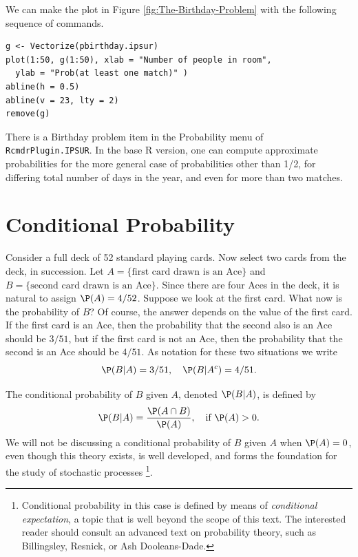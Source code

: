 \documentclass[captions=tableheading]{scrbook}
\begin{document}
We can make the plot in Figure \ref{fig:The-Birthday-Problem} with the following sequence of commands.


\begin{verbatim}
g <- Vectorize(pbirthday.ipsur)
plot(1:50, g(1:50), xlab = "Number of people in room", 
  ylab = "Prob(at least one match)" )
abline(h = 0.5)
abline(v = 23, lty = 2)
remove(g)
\end{verbatim}

There is a \textsf{Birthday problem} item in the \textsf{Probability} menu of \texttt{RcmdrPlugin.IPSUR}. In the base \textsf{R} version, one can compute approximate probabilities for the more general case of probabilities other than 1/2, for differing total number of days in the year, and even for more than two matches.
\section{Conditional Probability}
\label{sec-4-6}

\label{sec:Conditional-Probability}

Consider a full deck of 52 standard playing cards. Now select two cards from the deck, in succession. Let \( A = \{ \mbox{first card drawn is an Ace} \} \) and \( B = \{ \mbox{second card drawn is an Ace} \} \). Since there are four Aces in the deck, it is natural to assign \( \P(A) = 4/52 \). Suppose we look at the first card. What now is the probability of \(B\)? Of course, the answer depends on the value of the first card. If the first card is an Ace, then the probability that the second also is an Ace should be \( 3/51 \), but if the first card is not an Ace, then the probability that the second is an Ace should be \( 4/51 \). As notation for these two situations we write
\[
\P(B|A)=3/51,\quad\P(B|A^{c})=4/51.
\]

\begin{defn}
The conditional probability of \(B\) given \(A\), denoted \(\P(B|A)\), is defined by
\begin{equation}
\P(B|A)=\frac{\P(A\cap B)}{\P(A)},\quad\mbox{if }\P(A)>0.
\end{equation}
We will not be discussing a conditional probability of \(B\) given \(A\) when \(\P(A)=0\), even though this theory exists, is well developed, and forms the foundation for the study of stochastic processes
\footnote{Conditional probability in this case is defined by means of \emph{conditional expectation}, a topic that is well beyond the scope of this text. The interested reader should consult an advanced text on probability theory, such as Billingsley, Resnick, or Ash Dooleans-Dade.}.
\end{defn}
\end{document}
